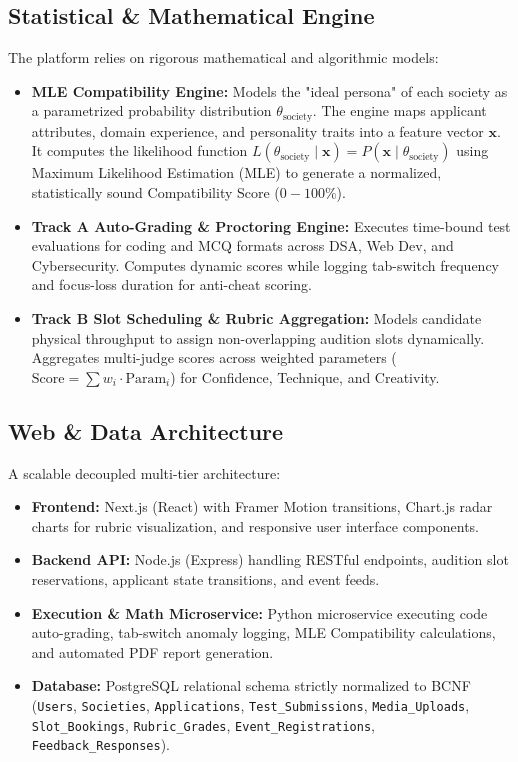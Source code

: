 \documentclass[11pt,a4paper]{article}
\begin{document}
\subsection{Statistical \& Mathematical Engine}
The platform relies on rigorous mathematical and algorithmic models:
\begin{itemize}[leftmargin=0.7cm]
    \item \textbf{MLE Compatibility Engine:} Models the "ideal persona" of each society as a parametrized probability distribution $\theta_{\text{society}}$. The engine maps applicant attributes, domain experience, and personality traits into a feature vector $\mathbf{x}$. It computes the likelihood function $L(\theta_{\text{society}} \mid \mathbf{x}) = P(\mathbf{x} \mid \theta_{\text{society}})$ using Maximum Likelihood Estimation (MLE) to generate a normalized, statistically sound Compatibility Score ($0 - 100\%$).
    \item \textbf{Track A Auto-Grading \& Proctoring Engine:} Executes time-bound test evaluations for coding and MCQ formats across DSA, Web Dev, and Cybersecurity. Computes dynamic scores while logging tab-switch frequency and focus-loss duration for anti-cheat scoring.
    \item \textbf{Track B Slot Scheduling \& Rubric Aggregation:} Models candidate physical throughput to assign non-overlapping audition slots dynamically. Aggregates multi-judge scores across weighted parameters ($\text{Score} = \sum w_i \cdot \text{Param}_i$) for Confidence, Technique, and Creativity.
\end{itemize}

\subsection{Web \& Data Architecture}
A scalable decoupled multi-tier architecture:
\begin{itemize}[leftmargin=0.7cm]
    \item \textbf{Frontend:} Next.js (React) with Framer Motion transitions, Chart.js radar charts for rubric visualization, and responsive user interface components.
    \item \textbf{Backend API:} Node.js (Express) handling RESTful endpoints, audition slot reservations, applicant state transitions, and event feeds.
    \item \textbf{Execution \& Math Microservice:} Python microservice executing code auto-grading, tab-switch anomaly logging, MLE Compatibility calculations, and automated PDF report generation.
    \item \textbf{Database:} PostgreSQL relational schema strictly normalized to BCNF (\texttt{Users}, \texttt{Societies}, \texttt{Applications}, \texttt{Test\_Submissions}, \texttt{Media\_Uploads}, \texttt{Slot\_Bookings}, \texttt{Rubric\_Grades}, \texttt{Event\_Registrations}, \texttt{Feedback\_Responses}).
\end{itemize}
\end{document}
